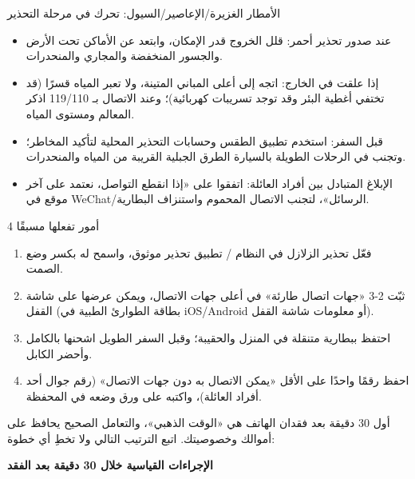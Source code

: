 \begin{tcbwarn}{الأمطار الغزيرة/الإعاصير/السيول: تحرك في مرحلة التحذير}
\begin{itemize}
  \item عند صدور تحذير أحمر: قلل الخروج قدر الإمكان، وابتعد عن الأماكن تحت الأرض والجسور المنخفضة والمجاري والمنحدرات.
  \item إذا علقت في الخارج: اتجه إلى أعلى المباني المتينة، ولا تعبر المياه قسرًا (قد تختفي أغطية البئر وقد توجد تسريبات كهربائية)؛ وعند الاتصال بـ 119/110 اذكر المعالم ومستوى المياه.
  \item قبل السفر: استخدم تطبيق الطقس وحسابات التحذير المحلية لتأكيد المخاطر؛ وتجنب في الرحلات الطويلة بالسيارة الطرق الجبلية القريبة من المياه والمنحدرات.
  \item الإبلاغ المتبادل بين أفراد العائلة: اتفقوا على «إذا انقطع التواصل، نعتمد على آخر موقع في WeChat/الرسائل»، لتجنب الاتصال المحموم واستنزاف البطارية.
\end{itemize}

\end{tcbwarn}

\begin{tcbpractice}{4 أمور تفعلها مسبقًا}
\begin{enumerate}
  \item فعّل تحذير الزلازل في النظام / تطبيق تحذير موثوق، واسمح له بكسر وضع الصمت.
  \item ثبّت 2-3 «جهات اتصال طارئة» في أعلى جهات الاتصال، ويمكن عرضها على شاشة القفل (بطاقة الطوارئ الطبية في iOS/Android أو معلومات شاشة القفل).
  \item احتفظ ببطارية متنقلة في المنزل والحقيبة؛ وقبل السفر الطويل اشحنها بالكامل وأحضر الكابل.
  \item احفظ رقمًا واحدًا على الأقل «يمكن الاتصال به دون جهات الاتصال» (رقم جوال أحد أفراد العائلة)، واكتبه على ورق وضعه في المحفظة.
\end{enumerate}

\end{tcbpractice}


أول 30 دقيقة بعد فقدان الهاتف هي «الوقت الذهبي»، والتعامل الصحيح يحافظ على أموالك وخصوصيتك. اتبع الترتيب التالي ولا تخطِ أي خطوة:

\textbf{الإجراءات القياسية خلال 30 دقيقة بعد الفقد}\par

